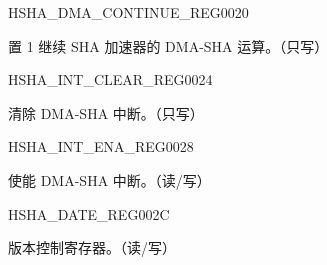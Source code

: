 \begin{register}{H}{SHA\_DMA\_CONTINUE\_REG}{\hexprefix{}0020}\label{regdesc:SHADMACONTINUEREG}
%
%
\regnewline%
\begin{regdesc}\begin{reglist}
\label{fielddesc:SHADMACONTINUE}\item [SHA\_DMA\_CONTINUE] 置 1 继续 SHA 加速器的 DMA-SHA 运算。（只写）
\end{reglist}\end{regdesc}
\end{register}


\begin{register}{H}{SHA\_INT\_CLEAR\_REG}{\hexprefix{}0024}\label{regdesc:SHAINTCLEARREG}
%
%
\regnewline%
\begin{regdesc}\begin{reglist}
\label{fielddesc:SHACLEARINTERRUPT}\item [SHA\_CLEAR\_INTERRUPT] 清除 DMA-SHA 中断。（只写）
\end{reglist}\end{regdesc}
\end{register}


\begin{register}{H}{SHA\_INT\_ENA\_REG}{\hexprefix{}0028}\label{regdesc:SHAINTENAREG}
%
%
\regnewline%
\begin{regdesc}\begin{reglist}
\label{fielddesc:SHAINTERRUPTENA}\item [SHA\_INTERRUPT\_ENA] 使能 DMA-SHA 中断。（读/写）
\end{reglist}\end{regdesc}
\end{register}


\begin{register}{H}{SHA\_DATE\_REG}{\hexprefix{}002C}\label{regdesc:SHADATEREG}
%
%
\regnewline%
\begin{regdesc}\begin{reglist}
\label{fielddesc:SHADATE}\item [SHA\_DATE] 版本控制寄存器。（读/写）
\end{reglist}\end{regdesc}
\end{register}


